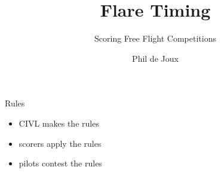 \documentclass{beamer}
\title{Flare Timing}
\subtitle{Scoring Free Flight Competitions}
\author{Phil de Joux}
\institute{Block Scope}
\date{}
\begin{document}
\begin{frame}
\titlepage
\end{frame}

\begin{frame}{Rules}
\begin{itemize}
    \item CIVL makes the rules
    \item scorers apply the rules
    \item pilots contest the rules
\end{itemize}
\end{frame}
\end{document}
